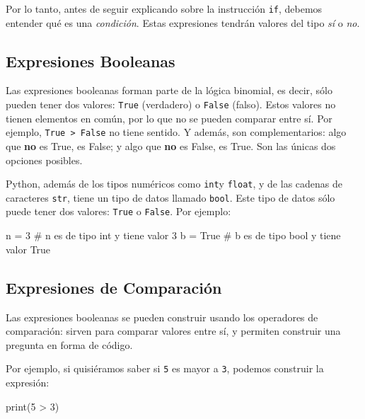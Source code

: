 \documentclass[
  letterpaper,
  DIV=11,
  numbers=noendperiod]{scrreprt}
\newenvironment{Shaded}{\begin{snugshade}}{\end{snugshade}}
\newcommand{\BuiltInTok}[1]{\textcolor[rgb]{0.00,0.23,0.31}{#1}}
\newcommand{\CommentTok}[1]{\textcolor[rgb]{0.37,0.37,0.37}{#1}}
\newcommand{\DecValTok}[1]{\textcolor[rgb]{0.68,0.00,0.00}{#1}}
\newcommand{\NormalTok}[1]{\textcolor[rgb]{0.00,0.23,0.31}{#1}}
\newcommand{\OperatorTok}[1]{\textcolor[rgb]{0.37,0.37,0.37}{#1}}
\newcommand{\VariableTok}[1]{\textcolor[rgb]{0.07,0.07,0.07}{#1}}
\begin{document}
Por lo tanto, antes de seguir explicando sobre la instrucción
\texttt{if}, debemos entender qué es una \emph{condición}. Estas
expresiones tendrán valores del tipo \emph{sí} o \emph{no}.

\subsection{Expresiones Booleanas}\label{expresiones-booleanas}

Las expresiones booleanas forman parte de la lógica binomial, es decir,
sólo pueden tener dos valores: \texttt{True} (verdadero) o
\texttt{False} (falso). Estos valores no tienen elementos en común, por
lo que no se pueden comparar entre sí. Por ejemplo,
\texttt{True\ \textgreater{}\ False} no tiene sentido. Y además, son
complementarios: algo que \textbf{no} es True, es False; y algo que
\textbf{no} es False, es True. Son las únicas dos opciones posibles.

Python, además de los tipos numéricos como \texttt{int}y \texttt{float},
y de las cadenas de caracteres \texttt{str}, tiene un tipo de datos
llamado \texttt{bool}. Este tipo de datos sólo puede tener dos valores:
\texttt{True} o \texttt{False}. Por ejemplo:

\begin{Shaded}
\begin{Highlighting}[]
\NormalTok{n }\OperatorTok{=} \DecValTok{3} \CommentTok{\# n es de tipo \textquotesingle{}int\textquotesingle{} y tiene valor 3}
\NormalTok{b }\OperatorTok{=} \VariableTok{True} \CommentTok{\# b es de tipo \textquotesingle{}bool\textquotesingle{} y tiene valor True}
\end{Highlighting}
\end{Shaded}

\subsection{Expresiones de
Comparación}\label{expresiones-de-comparaciuxf3n}

Las expresiones booleanas se pueden construir usando los operadores de
comparación: sirven para comparar valores entre sí, y permiten construir
una pregunta en forma de código.

Por ejemplo, si quisiéramos saber si \texttt{5} es mayor a \texttt{3},
podemos construir la expresión:

\begin{Shaded}
\begin{Highlighting}[]
\BuiltInTok{print}\NormalTok{(}\DecValTok{5} \OperatorTok{\textgreater{}} \DecValTok{3}\NormalTok{)}
\end{Highlighting}
\end{Shaded}
\end{document}
